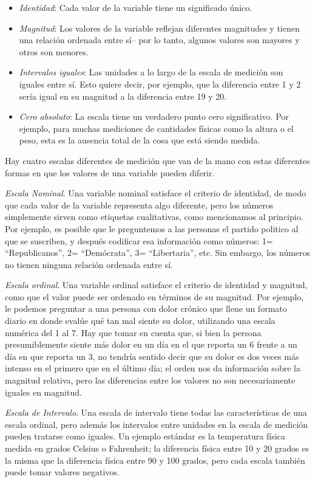 \documentclass[
  12pt,
]{book}
\providecommand{\tightlist}{%
  \setlength{\itemsep}{0pt}\setlength{\parskip}{0pt}}
\begin{document}
\begin{itemize}
\tightlist
\item
  \emph{Identidad}: Cada valor de la variable tiene un significado único.
\item
  \emph{Magnitud}: Los valores de la variable reflejan diferentes magnitudes y tienen una relación ordenada entre sí-- por lo tanto, algunos valores son mayores y otros son menores.
\item
  \emph{Intervalos iguales}: Las unidades a lo largo de la escala de medición son iguales entre sí. Esto quiere decir, por ejemplo, que la diferencia entre 1 y 2 sería igual en su magnitud a la diferencia entre 19 y 20.
\item
  \emph{Cero absoluto}: La escala tiene un verdadero punto cero significativo. Por ejemplo, para muchas mediciones de cantidades físicas como la altura o el peso, esta es la ausencia total de la cosa que está siendo medida.
\end{itemize}

Hay cuatro escalas diferentes de medición que van de la mano con estas diferentes formas en que los valores de una variable pueden diferir.

\emph{Escala Nominal}. Una variable nominal satisface el criterio de identidad, de modo que cada valor de la variable representa algo diferente, pero los números simplemente sirven como etiquetas cualitativas, como mencionamos al principio. Por ejemplo, es posible que le preguntemos a las personas el partido politico al que se suscriben, y después codificar esa información como números: 1= ``Republicanos'', 2= ``Demócrata'', 3= ``Libertaria'', etc. Sin embargo, los números no tienen ninguna relación ordenada entre sí.

\emph{Escala ordinal}. Una variable ordinal satisface el criterio de identidad y magnitud, como que el valor puede ser ordenado en términos de su magnitud. Por ejemplo, le podemos preguntar a una persona con dolor crónico que llene un formato diario en donde evalúe qué tan mal siente su dolor, utilizando una escala numérica del 1 al 7. Hay que tomar en cuenta que, si bien la persona presumiblemente siente más dolor en un día en el que reporta un 6 frente a un día en que reporta un 3, no tendría sentido decir que su dolor es dos veces más intenso en el primero que en el último día; el orden nos da información sobre la magnitud relativa, pero las diferencias entre los valores no son necesariamente iguales en magnitud.

\emph{Escala de Intervalo}. Una escala de intervalo tiene todas las características de una escala ordinal, pero además los intervalos entre unidades en la escala de medición pueden tratarse como iguales. Un ejemplo estándar es la temperatura física medida en grados Celsius o Fahrenheit; la diferencia física entre 10 y 20 grados es la misma que la diferencia física entre 90 y 100 grados, pero cada escala también puede tomar valores negativos.
\end{document}
